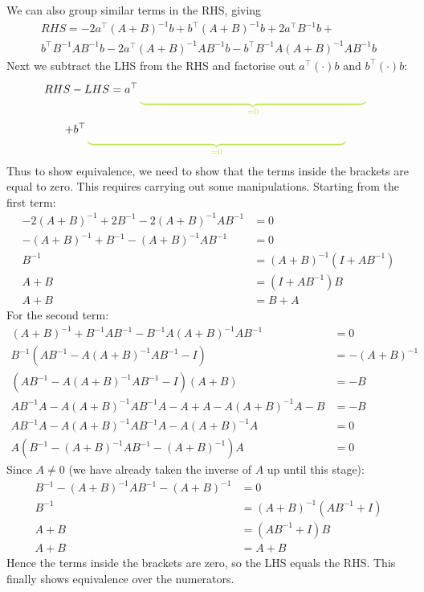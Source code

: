 \documentclass[11pt]{report} %
\begin{document}
We can also group similar terms in the RHS, giving
\begin{multline}
RHS=-2a^{\top}\left(A+B\right)^{-1}b+b^{\top}\left(A+B\right)^{-1}b+2a^{\top}B^{-1}b+ \\
b^{\top}B^{-1}AB^{-1}b-2a^{\top}\left(A+B\right)^{-1}AB^{-1}b-b^{\top}B^{-1}A\left(A+B\right)^{-1}AB^{-1}b
\end{multline}
Next we subtract the LHS from the RHS and factorise out $a^{\top}\left(\cdot\right)b$ and $b^{\top}\left(\cdot\right)b$:
\begin{multline}
RHS-LHS=a^{\top}\green\underbrace{\black\left(-2\left(A+B\right)^{-1}+2B^{-1}-2\left(A+B\right)^{-1}AB^{-1}\right)}_{\green=0}\black b \\
+b^{\top}\green\underbrace{\black\left(\left(A+B\right)^{-1}+B^{-1}AB^{-1}-B^{-1}A\left(A+B\right)^{-1}AB^{-1}\right)}_{\green =0}\black b
\end{multline}
Thus to show equivalence, we need to show that the terms inside the brackets are equal to zero. This requires carrying out some manipulations. Starting from the first term:
\begin{align}
-2\left(A+B\right)^{-1}+2B^{-1}-2\left(A+B\right)^{-1}AB^{-1}&=0 \\
-\left(A+B\right)^{-1}+B^{-1}-\left(A+B\right)^{-1}AB^{-1}&=0 \\
B^{-1}&=\left(A+B\right)^{-1}\left(I+AB^{-1}\right) \\
A+B&=\left(I+AB^{-1}\right)B \\
A+B&=B+A
\end{align}
For the second term:
\begin{align}
\left(A+B\right)^{-1}+B^{-1}AB^{-1}-B^{-1}A\left(A+B\right)^{-1}AB^{-1}&=0 \\
B^{-1}\left(AB^{-1}-A\left(A+B\right)^{-1}AB^{-1}-I\right)&=-\left(A+B\right)^{-1} \\
\left(AB^{-1}-A\left(A+B\right)^{-1}AB^{-1}-I\right)\left(A+B\right)&=-B \\
AB^{-1}A-A\left(A+B\right)^{-1}AB^{-1}A-A+A-A\left(A+B\right)^{-1}A-B&=-B \\
AB^{-1}A-A\left(A+B\right)^{-1}AB^{-1}A-A\left(A+B\right)^{-1}A&=0 \\
A\left(B^{-1}-\left(A+B\right)^{-1}AB^{-1}-\left(A+B\right)^{-1}\right)A&=0
\end{align}
Since $A \neq 0$ (we have already taken the inverse of $A$ up until this stage):
\begin{align}
B^{-1}-\left(A+B\right)^{-1}AB^{-1}-\left(A+B\right)^{-1}&=0 \\
B^{-1}&=\left(A+B\right)^{-1}\left(AB^{-1}+I\right) \\
A+B&=\left(AB^{-1}+I\right)B \\
A+B&=A+B
\end{align}
Hence the terms inside the brackets are zero, so the LHS equals the RHS. This finally shows equivalence over the numerators.
\end{document}
